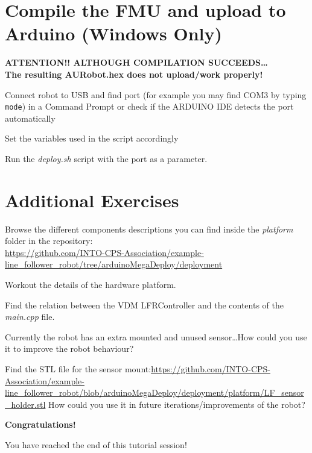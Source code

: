\documentclass[11pt,a4paper]{../tutorial}
\begin{document}
\section{Compile the FMU and upload to Arduino (Windows Only)}

\textbf{ATTENTION!! ALTHOUGH COMPILATION SUCCEEDS\ldots \\ The resulting AURobot.hex does not upload/work properly!}

\begin{instructions} 
\item Connect robot to USB and find port (for example you may find COM3 by typing \verb'mode') in a Command Prompt or check if the ARDUINO IDE detects the port automatically 

\item Set the variables used in the script accordingly


\item Run the \emph{deploy.sh} script with the port as a parameter. 

\end{instructions}

\section{Additional Exercises}

\begin{instructions} 

\item Browse the different components descriptions you can find inside the \emph{platform} folder in the repository:\\
\url{https://github.com/INTO-CPS-Association/example-line\_follower\_robot/tree/arduinoMegaDeploy/deployment}

\item Workout the details of the hardware platform.

\item Find the relation between the VDM LFRController and the contents of the \emph{main.cpp} file.

\item Currently the robot has an extra mounted and unused sensor\ldots How could you use it to improve the robot behaviour?

\item Find the STL file for the sensor mount:\url{https://github.com/INTO-CPS-Association/example-line_follower_robot/blob/arduinoMegaDeploy/deployment/platform/LF_sensor_holder.stl} How could you use it in future iterations/improvements of the robot? 

\end{instructions}

    \bigskip
    \bigskip
    {\large\bfseries Congratulations!}

    You have reached the end of this tutorial session! 
\end{document}
